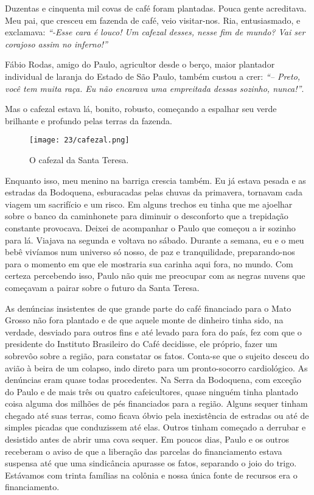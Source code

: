 Duzentas e cinquenta mil covas de café foram plantadas.
Pouca gente acreditava.
Meu pai, que cresceu em fazenda de café, veio visitar-nos.
Ria, entusiasmado, e exclamava:
\textit{``-Esse cara é louco! Um cafezal desses, nesse fim de mundo? Vai ser corajoso assim no inferno!'' }

Fábio Rodas, amigo do Paulo, agricultor desde o berço, maior plantador individual de laranja do Estado de São Paulo, também custou a crer:
\textit{``-- Preto, você tem muita raça.
Eu não encarava uma empreitada dessas sozinho, nunca!''}.

Mas o cafezal estava lá, bonito, robusto, começando a espalhar seu verde brilhante e profundo pelas terras da fazenda.

\begin{figure}
\centering
\texttt{[image: 23/cafezal.png]}
\caption{O cafezal da Santa Teresa.}
\end{figure}
  
Enquanto isso, meu menino na barriga crescia também.
Eu já estava pesada e as estradas da Bodoquena, esburacadas pelas chuvas da primavera, tornavam cada viagem um sacrifício e um risco.
Em alguns trechos eu tinha que me ajoelhar sobre o banco da caminhonete para diminuir o desconforto que a trepidação constante provocava.
Deixei de acompanhar o Paulo que começou a ir sozinho para lá.
Viajava na segunda e voltava no sábado.
Durante a semana, eu e o meu bebê vivíamos num universo só nosso, de paz e tranquilidade, preparando-nos para o momento em que ele mostraria sua carinha aqui fora, no mundo.
Com certeza percebendo isso, Paulo não quis me preocupar com as negras nuvens que começavam a pairar sobre o futuro da Santa Teresa.

As denúncias insistentes de que grande parte do café financiado para o Mato Grosso não fora plantado e de que aquele monte de dinheiro tinha sido, na verdade, desviado para outros fins e até levado para fora do país, fez com que o presidente do Instituto Brasileiro do Café decidisse, ele próprio, fazer um sobrevôo sobre a região, para constatar os fatos.
Conta-se que o sujeito desceu do avião à beira de um colapso, indo direto para um pronto-socorro cardiológico.
As denúncias eram quase todas procedentes.
Na Serra da Bodoquena, com exceção do Paulo e de mais três ou quatro cafeicultores, quase ninguém tinha plantado coisa alguma dos milhões de pés financiados para a região.
Alguns sequer tinham chegado até suas terras, como ficava óbvio pela inexistência de estradas ou até de simples picadas que conduzissem até elas.
Outros tinham começado a derrubar e desistido antes de abrir uma cova sequer.
Em poucos dias, Paulo e os outros receberam o aviso de que a liberação das parcelas do financiamento estava suspensa até que uma sindicância apurasse os fatos, separando o joio do trigo.
Estávamos com trinta famílias na colônia e nossa única fonte de recursos era o financiamento.

